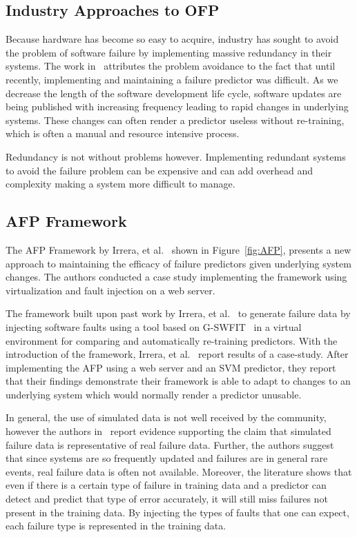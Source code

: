 \subsection{Industry Approaches to \ac{OFP}} \label{industry}
Because hardware has become so easy to acquire, industry has sought to avoid
the problem of software failure by implementing massive redundancy in their
systems.  The work in~\cite{watanabe2014,irrera2015} attributes the problem
avoidance to the fact that until recently, implementing and maintaining a
failure predictor was difficult.  As we decrease the length of the software
development life cycle, software updates are being published with increasing
frequency leading to rapid changes in underlying systems.  These changes can
often render a predictor useless without re-training, which is often a manual
and resource intensive process.

Redundancy is not without problems however.  Implementing redundant systems to
avoid the failure problem can be expensive and can add overhead and complexity
making a system more difficult to manage.

\subsection{\ac{AFP} Framework} \label{afp}
The \ac{AFP} Framework by Irrera, et al.~\cite{irrera2015} shown in
Figure~\ref{fig:AFP}, presents a new approach to maintaining the efficacy of
failure predictors given underlying system changes.  The authors conducted a
case study implementing the framework using virtualization and fault injection
on a web server.  


The framework built upon past work by Irrera, et
al.~\cite{irrera2013,irrera2014} to generate failure data by injecting software
faults using a tool based on \ac{G-SWFIT}~\cite{gswfit} in a virtual
environment for comparing and automatically re-training predictors.  With the
introduction of the framework, Irrera, et al.~\cite{irrera2015} report results
of a case-study.  After implementing the \ac{AFP} using a web server and an
\ac{SVM} predictor, they report that their findings demonstrate their framework
is able to adapt to changes to an underlying system which would normally render
a predictor unusable.

In general, the use of simulated data is not well received by the community,
however the authors in~\cite{irrera2010,irrera2014} report evidence supporting
the claim that simulated failure data is representative of real failure data.
Further, the authors suggest that since systems are so frequently updated and
failures are in general rare events, real failure data is often not available.
Moreover, the literature shows that even if there is a certain type of failure
in training data and a predictor can detect and predict that type of error
accurately, it will still miss failures not present in the training data.  By
injecting the types of faults that one can expect, each failure type is
represented in the training data.

